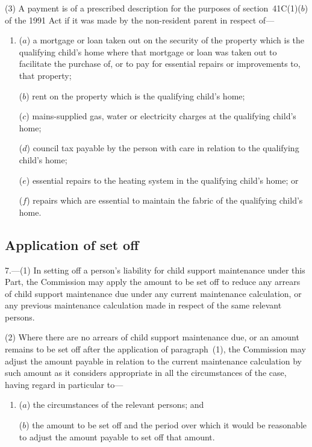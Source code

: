 \documentclass[12pt,a4paper]{article}
\begin{document}
(3) A payment is of a prescribed description for the purposes of section~41C(1)($b$)  of the 1991 Act if it was made by the non-resident parent in respect of—
\begin{enumerate}\item[]
($a$) a mortgage or loan taken out on the security of the property which is the qualifying child’s home where that mortgage or loan was taken out to facilitate the purchase of, or to pay for essential repairs or improvements to, that property;

($b$) rent on the property which is the qualifying child’s home;

($c$) mains-supplied gas, water or electricity charges at the qualifying child’s home;

($d$) council tax payable by the person with care in relation to the qualifying child’s home;

($e$) essential repairs to the heating system in the qualifying child’s home; or

($f$) repairs which are essential to maintain the fabric of the qualifying child’s home.
\end{enumerate}

\subsection[7. Application of set off]{Application of set off}

7.---(1)  In setting off a person’s liability for child support maintenance under this Part, the Commission may apply the amount to be set off to reduce any arrears of child support maintenance due under any current maintenance calculation, or any previous maintenance calculation made in respect of the same relevant persons.

(2) Where there are no arrears of child support maintenance due, or an amount remains to be set off after the application of paragraph~(1), the Commission may adjust the amount payable in relation to the current maintenance calculation by such amount as it considers appropriate in all the circumstances of the case, having regard in particular to—
\begin{enumerate}\item[]
($a$) the circumstances of the relevant persons; and

($b$) the amount to be set off and the period over which it would be reasonable to adjust the amount payable to set off that amount.
\end{enumerate}
\end{document}
